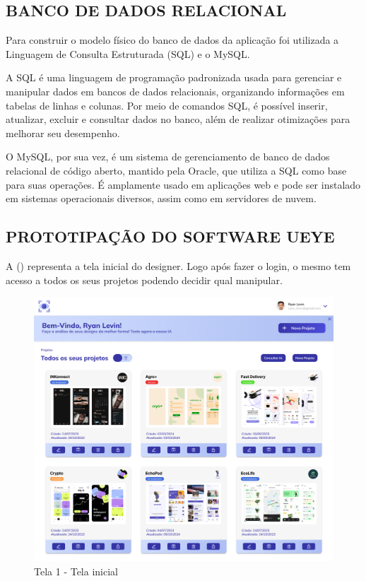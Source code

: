 \subsection*{BANCO DE DADOS RELACIONAL}
Para construir o modelo físico do banco de dados da aplicação foi utilizada a Linguagem de Consulta Estruturada (SQL) e o MySQL.

A SQL é uma linguagem de programação padronizada usada para gerenciar e manipular dados em bancos de dados relacionais, organizando informações em tabelas de linhas e colunas. Por meio de comandos SQL, é possível inserir, atualizar, excluir e consultar dados no banco, além de realizar otimizações para melhorar seu desempenho.

O MySQL, por sua vez, é um sistema de gerenciamento de banco de dados relacional de código aberto, mantido pela Oracle, que utiliza a SQL como base para suas operações. É amplamente usado em aplicações web e pode ser instalado em sistemas operacionais diversos, assim como em servidores de nuvem. \textcite{Amazon}\newline

\subsection*{PROTOTIPAÇÃO DO SOFTWARE UEYE}
A () representa a tela inicial do designer. Logo após fazer o login, o mesmo tem acesso a todos os seus projetos podendo decidir qual manipular.

\begin{figure}[H]
    \centering
    \caption{Tela 1 - Tela inicial}%
    \label{fig:pg-tela1}
    \includegraphics[width=0.72\linewidth]{Illustrations/tela1.png}
\end{figure}

